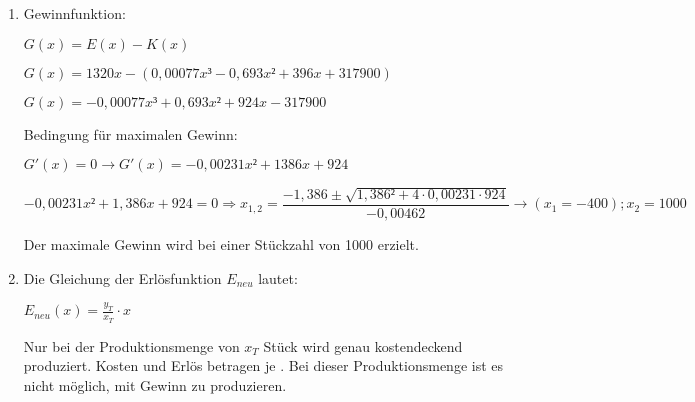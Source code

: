 \begin{langesbeispiel}
{\begin{enumerate}
Der Stückpreis muss erhöht werden. Die Nullstellen liegen weiter auseinander, das heißt, der Gewinnbereich wird größer.

\item Gewinnfunktion:

$G(x)=E(x)-K(x)$

$G(x)=1320x-(0,00077x³-0,693x²+396x+317900)$

$G(x)=-0,00077x³+0,693x²+924x-317900$

Bedingung für maximalen Gewinn:

$G'(x)=0 \rightarrow G'(x)=-0,00231x²+1386x+924$

$-0,00231x²+1,386x+924=0 \Rightarrow x_{1,2}=\dfrac{-1,386\pm\sqrt{1,386²+4\cdot 0,00231\cdot 924}}{-0,00462} \rightarrow (x_1=-400); x_2=1000$

Der maximale Gewinn wird bei einer Stückzahl von 1000 erzielt.

\item Die Gleichung der Erlösfunktion $E_{neu}$ lautet:

$E_{neu}(x)=\frac{y_T}{x_T}\cdot x$

Nur bei der Produktionsmenge von $x_T$ Stück wird genau kostendeckend produziert. Kosten und Erlös betragen je . Bei dieser Produktionsmenge ist es nicht möglich, mit Gewinn zu produzieren.
\end{enumerate}}
\end{langesbeispiel}